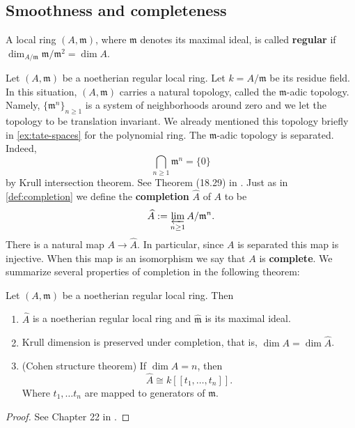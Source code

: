 \subsection*{Smoothness and completeness}
\begin{definition}\label{def:regular-local-ring}
	A local ring $(A, \mathfrak{m})$, where $\mathfrak{m}$ denotes its maximal ideal, is called \textbf{regular} if $\dim_{A/\mathfrak{m}} \mathfrak{m}/\mathfrak{m}^{2} = \dim A$. 
\end{definition}
Let $(A,\mathfrak{m})$ be a noetherian regular local ring. Let $k = A/\mathfrak{m}$ be its residue field. In this situation, $(A,\mathfrak{m})$ carries a natural topology, called the $\mathfrak{m}$-adic topology. Namely, $\{\mathfrak{m}^{n}\}_{n\geq 1}$ is a system of neighborhoods around zero and we let the topology to be translation invariant. We already mentioned this topology briefly in \cref{ex:tate-spaces} for the polynomial ring. The $\mathfrak{m}$-adic topology is separated. Indeed, 
\[
	\bigcap_{n\geq 1} \mathfrak{m}^{n} = \{0\}
\]
by Krull intersection theorem. See Theorem (18.29) in \cite{comm-alg}. Just as in \cref{def:completion} we define the \textbf{completion} $\widehat{A}$ of $A$ to be 
\[
	\widehat{A} := \varprojlim_{n\geq 1} A/\mathfrak{m}^{n}.
\]
There is a natural map $A \to \widehat{A}$. In particular, since $A$ is separated this map is injective. When this map is an isomorphism we say that $A$ is \textbf{complete}. We summarize several properties of completion in the following theorem:
\begin{theorem}\label{thm:properties-adic-completion}
	Let $(A,\mathfrak{m})$ be a noetherian regular local ring. Then
	\begin{enumerate}[label = (\alph*)]
		\item $\widehat{A}$ is a noetherian regular local ring and $\widehat{\mathfrak{m}}$ is its maximal ideal.
		\item Krull dimension is preserved under completion, that is, $\dim A = \dim \widehat{A}$.
		\item (Cohen structure theorem) If $\dim A = n$, then
		\[
			\widehat{A} \cong k\left[[t_{1}, \ldots, t_{n}]\right].
		\]
		Where $t_{1}, \ldots t_{n}$ are mapped to generators of $\mathfrak{m}$.
	\end{enumerate}
	\begin{proof}
	See Chapter 22 in \cite{comm-alg}.  
	\end{proof}
	
\end{theorem}
